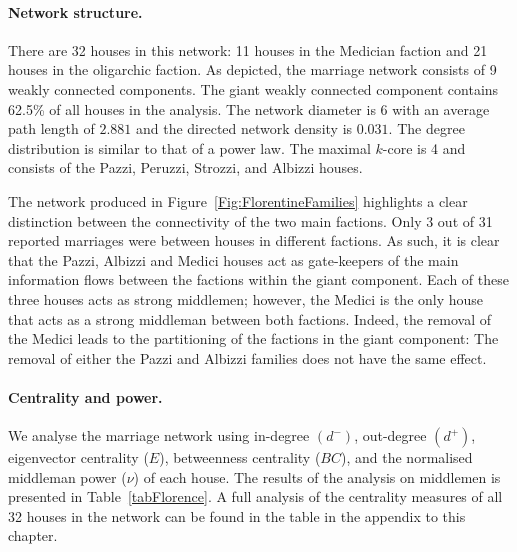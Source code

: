 \paragraph{Network structure.}

There are 32 houses in this network: 11 houses in the Medician faction and 21 houses in the oligarchic faction. As depicted, the marriage network consists of 9 weakly connected components. The giant weakly connected component contains 62.5\% of all houses in the analysis. The network diameter is 6 with an average path length of $2.881$ and the directed network density is $0.031$. The degree distribution is similar to that of a power law. The maximal $k$-core is 4 and consists of the Pazzi, Peruzzi, Strozzi, and Albizzi houses.

The network produced in Figure~\ref{Fig:FlorentineFamilies} highlights a clear distinction between the connectivity of the two main factions. Only 3 out of 31 reported marriages were between houses in different factions. As such, it is clear that the Pazzi, Albizzi and Medici houses act as gate-keepers of the main information flows between the factions within the giant component. Each of these three houses acts as strong middlemen; however, the Medici is the only house that acts as a strong middleman between both factions. Indeed, the removal of the Medici leads to the partitioning of the factions in the giant component: The removal of either the Pazzi and Albizzi families does not have the same effect.

\paragraph{Centrality and power.}

We analyse the marriage network using in-degree $\left(d^-\right)$, out-degree $\left(d^+\right)$, \citet{Bonacich1987} eigenvector centrality ($E$), betweenness centrality ($BC$), and the normalised middleman power ($\nu$) of each house. The results of the analysis on middlemen is presented in Table~\ref{tabFlorence}. A full analysis of the centrality measures of all 32 houses in the network can be found in the table in the appendix to this chapter.

